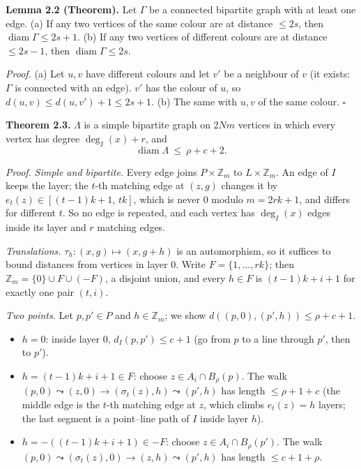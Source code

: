 \documentclass[
  10pt,
]{article}
\providecommand{\tightlist}{%
  \setlength{\itemsep}{0pt}\setlength{\parskip}{0pt}}
\begin{document}
\textbf{Lemma 2.2 (Theorem).} Let \(\Gamma\) be a connected bipartite
graph with at least one edge. (a) If any two vertices of the same colour
are at distance \(\le 2s\), then \(\operatorname{diam}\Gamma\le 2s+1\).
(b) If any two vertices of different colours are at distance
\(\le 2s-1\), then \(\operatorname{diam}\Gamma\le 2s\).

\emph{Proof.} (a) Let \(u, v\) have different colours and let \(v'\) be
a neighbour of \(v\) (it exists: \(\Gamma\) is connected with an edge).
\(v'\) has the colour of \(u\), so \(d(u,v)\le d(u,v')+1\le 2s+1\). (b)
The same with \(u, v\) of the same colour. \(\square\)

\textbf{Theorem 2.3.} \(\Lambda\) is a simple bipartite graph on \(2Nm\)
vertices in which every vertex has degree \(\deg_I(x) + r\), and
\[\operatorname{diam}\Lambda\ \le\ \rho + c + 2 .\]

\emph{Proof.} \emph{Simple and bipartite.} Every edge joins
\(P\times\mathbb Z_m\) to \(L\times\mathbb Z_m\). An edge of \(I\) keeps
the layer; the \(t\)-th matching edge at \((z,g)\) changes it by
\(e_t(z)\in[(t-1)k+1,\,tk]\), which is never \(0\) modulo \(m = 2rk+1\),
and differs for different \(t\). So no edge is repeated, and each vertex
has \(\deg_I(x)\) edges inside its layer and \(r\) matching edges.

\emph{Translations.} \(\tau_h:(x,g)\mapsto(x,g+h)\) is an automorphism,
so it suffices to bound distances from vertices in layer 0. Write
\(F = \{1,\dots,rk\}\); then \(\mathbb Z_m = \{0\}\cup F\cup(-F)\), a
disjoint union, and every \(h\in F\) is \((t-1)k+i+1\) for exactly one
pair \((t,i)\).

\emph{Two points.} Let \(p, p'\in P\) and \(h\in\mathbb Z_m\); we show
\(d((p,0),(p',h))\le\rho+c+1\).

\begin{itemize}
\tightlist
\item
  \(h = 0\): inside layer 0, \(d_I(p,p')\le c+1\) (go from \(p\) to a
  line through \(p'\), then to \(p'\)).
\item
  \(h = (t-1)k+i+1\in F\): choose \(z\in A_i\cap B_\rho(p)\). The walk
  \((p,0)\leadsto(z,0)\to(\sigma_t(z),h)\leadsto(p',h)\) has length
  \(\le\rho + 1 + c\) (the middle edge is the \(t\)-th matching edge at
  \(z\), which climbs \(e_t(z) = h\) layers; the last segment is a
  point--line path of \(I\) inside layer \(h\)).
\item
  \(h = -((t-1)k+i+1)\in -F\): choose \(z\in A_i\cap B_\rho(p')\). The
  walk \((p,0)\leadsto(\sigma_t(z),0)\to(z,h)\leadsto(p',h)\) has length
  \(\le c+1+\rho\).
\end{itemize}
\end{document}
